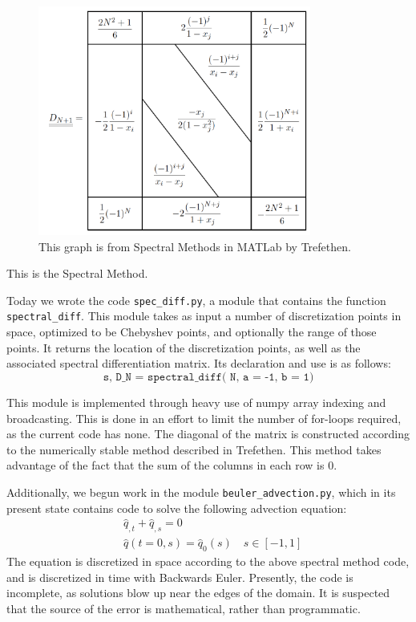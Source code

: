 \documentclass[12pt]{article}
\begin{document}
\begin{figure}[H]
\centering
\includegraphics[width=0.8\textwidth]{Chebyshev.jpg}
\caption{This graph is from Spectral Methods in MATLab by Trefethen.}
\end{figure}
This is the Spectral Method. 

Today we wrote the code \texttt{spec\_diff.py}, a module that contains the function \texttt{spectral\_diff}.
This module takes as input a number of discretization points in space, optimized to be Chebyshev points, and optionally the range of those points. 
It returns the location of the discretization points, as well as the associated spectral differentiation matrix.
Its declaration and use is as follows:
$$\texttt{s, D\_N = spectral\_diff( N, a = -1, b = 1)}$$

This module is implemented through heavy use of numpy array indexing and broadcasting. 
This is done in an effort to limit the number of for-loops required, as the current code has none.
The diagonal of the matrix is constructed according to the numerically stable method described in Trefethen.
This method takes advantage of the fact that the sum of the columns in each row is 0.

Additionally, we begun work in the module \texttt{beuler\_advection.py}, which in its present state contains code to solve the following advection equation:
\begin{align*}
	&\hat{q}_{,t} + \hat{q}_{,s} = 0\\
	&\hat{q}(t=0, s) = \hat{q}_0(s) \quad s \in [-1, 1]
\end{align*}
The equation is discretized in space according to the above spectral method code, and is discretized in time with Backwards Euler. 
Presently, the code is incomplete, as solutions blow up near the edges of the domain.
It is suspected that the source of the error is mathematical, rather than programmatic. 
\end{document}

